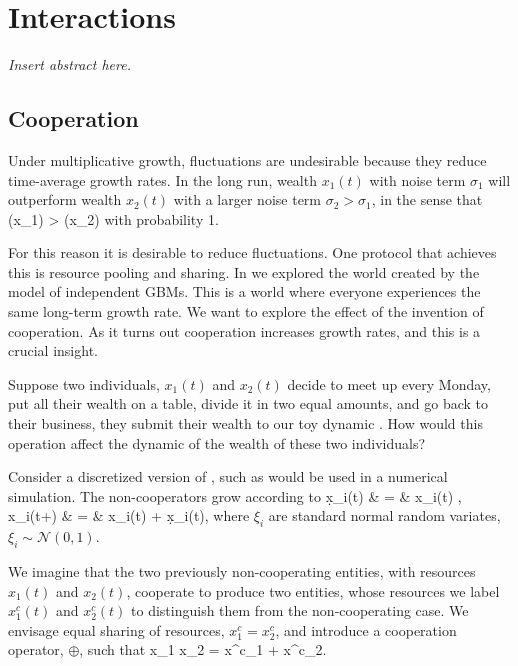 \newpage


\section{Interactions}
{\it
Insert abstract here.
}
\newpage



\subsection{Cooperation}
Under multiplicative growth, fluctuations are undesirable because they reduce 
time-average growth rates. In the long run, wealth $x_1(t)$ with noise term 
$\sigma_1$ will outperform wealth $x_2(t)$ with a larger 
noise term $\sigma_2>\sigma_1$, in the sense that 
\be
\gt(x_1) > \gt(x_2)
\ee
with probability 1.

For this reason it is desirable to reduce fluctuations. One protocol that achieves this is 
resource pooling and sharing. In  we explored the world created 
by the model of independent GBMs. This is a world where everyone experiences the 
same long-term growth rate. We want to explore the effect of the invention of 
cooperation. As it turns out cooperation increases growth rates, and this is a 
crucial insight. 

Suppose two individuals, $x_1(t)$ and $x_2(t)$ decide to meet up every Monday, put all 
their wealth on a table, divide it in two equal amounts, and go back to their business, \ie
they submit their wealth to our toy dynamic . How 
would this operation affect the dynamic of the wealth of these two individuals?

 Consider a discretized version of , such as would be used in a numerical simulation. The non-cooperators grow according to
 \bea
 \d x_i(t) & = & x_i(t) ,  \\
 x_i(t+\dt) & = & x_i(t) + \d x_i(t), 
 \eea
 where $\xi_i$ are standard normal random variates, $\xi_i\sim \mathcal{N}(0,1)$.

We imagine that the two previously non-cooperating entities, with resources $x_1(t)$ and $x_2(t)$, cooperate to produce two entities, whose resources we label $x^c_1(t)$ and $x^c_2(t)$ to distinguish them from the non-cooperating case. We envisage equal sharing of resources, $x^c_1=x^c_2$, and introduce a cooperation operator, $\oplus$, such that
 \be
 x_1 \oplus x_2 = x^c_1 + x^c_2.
 \ee
 
